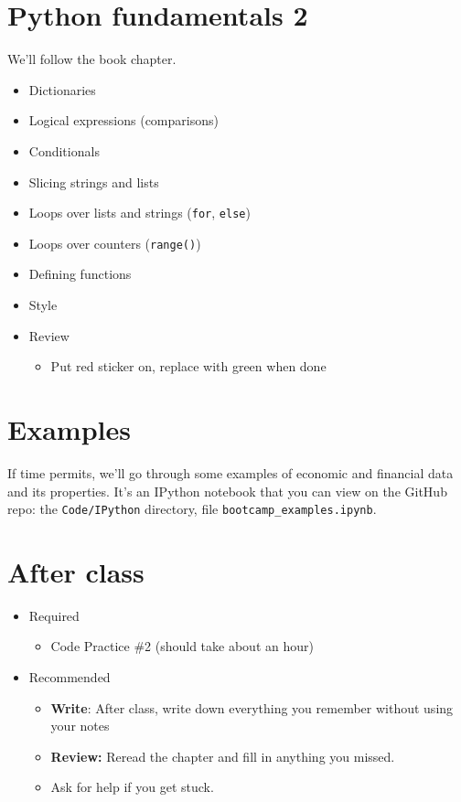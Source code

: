 \documentclass[11pt]{article}
\begin{document}
\section*{Python fundamentals 2}

We'll follow the book chapter.
\begin{itemize}
\item Dictionaries
\item Logical expressions (comparisons)
\item Conditionals
\item Slicing strings and lists
\item Loops over lists and strings ({\tt for}, {\tt else})
\item Loops over counters ({\tt range()})
\item Defining functions
\item Style
\item Review
\begin{itemize}
\item Put red sticker on, replace with green when done
\end{itemize}
\end{itemize}

\section*{Examples}

If time permits, we'll go through some examples of economic and financial data
and its properties.  It's an IPython notebook that you can view on the GitHub repo:
the \verb|Code/IPython| directory,
file \verb|bootcamp_examples.ipynb|.


\section*{After class}

\begin{itemize}
\item Required
\begin{itemize}
\item Code Practice \#2 (should take about an hour)
\end{itemize}
\item Recommended
\begin{itemize}
\item {\bf Write}:  After class, write down everything you remember without using your notes
\item {\bf Review:} Reread the chapter and fill in anything you missed.
\item Ask for help if you get stuck.
\end{itemize}
\end{itemize}


\end{document}
